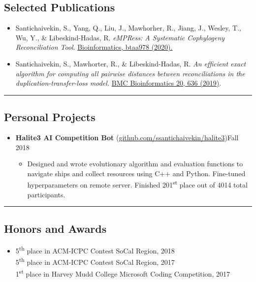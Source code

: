 \documentclass[10pt,letterpaper]{article}
\begin{document}
\subsection*{Selected Publications}
\begin{itemize}[label={}]
  \parskip=-0.45em
  \item Santichaivekin, S., Yang, Q., Liu, J., Mawhorher, R., Jiang, J., Wesley, T., Wu, Y., \& Libeskind-Hadas, R. \textit{eMPRess: A Systematic Cophylogeny Reconciliation Tool}. \href{https://doi.org/10.1093/bioinformatics/btaa978}{Bioinformatics, btaa978 (2020).}
  \vspace{0.2em}
  \item Santichaivekin, S., Mawhorter, R., \& Libeskind-Hadas, R. \textit{An efficient exact algorithm for computing all pairwise distances between reconciliations in the duplication-transfer-loss model.} \href{https://doi.org/10.1186/s12859-019-3203-9}{BMC Bioinformatics 20, 636 (2019)}.
\end{itemize}

  
\hrule
\vspace{-0.95em}
\subsection*{Personal Projects}
  \begin{itemize}
    \parskip=-0.45em
    \item[]
    {\textbf{Halite3 AI Competition Bot} (\href{https://github.com/ssantichaivekin/halite3}
    {github.com/ssantichaivekin/halite3})\hfill {Fall 2018}}
    \begin{itemize}[label=\textbullet]
        \item  Designed and wrote evolutionary algorithm and evaluation functions to navigate ships and collect resources using C++ and Python. Fine-tuned hyperparameters on remote server. Finished 201\textsuperscript{st} place out of 4014 total participants.
    \end{itemize}
  \end{itemize}

\hrule
\vspace{-0.95em}
\subsection*{Honors and Awards}
  \begin{itemize}
    \parskip=-0.5em
    \item[]
    {5\textsuperscript{th} place in ACM-ICPC Contest SoCal Region, 2018}\\
    {5\textsuperscript{th} place in ACM-ICPC Contest SoCal Region, 2017}\\
    {1\textsuperscript{st} place in Harvey Mudd College Microsoft Coding Competition, 2017}
  \end{itemize}

\end{document}
